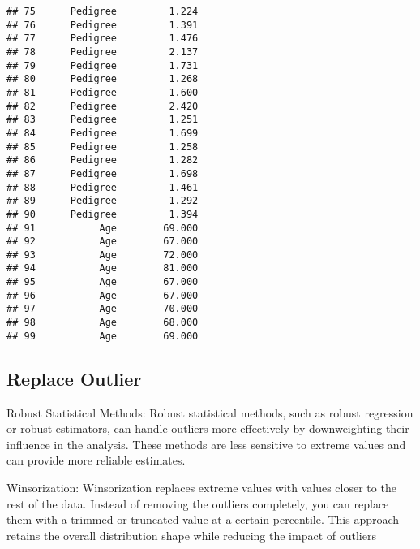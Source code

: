 \documentclass[
]{article}
\begin{document}
\begin{verbatim}
## 75      Pedigree         1.224
## 76      Pedigree         1.391
## 77      Pedigree         1.476
## 78      Pedigree         2.137
## 79      Pedigree         1.731
## 80      Pedigree         1.268
## 81      Pedigree         1.600
## 82      Pedigree         2.420
## 83      Pedigree         1.251
## 84      Pedigree         1.699
## 85      Pedigree         1.258
## 86      Pedigree         1.282
## 87      Pedigree         1.698
## 88      Pedigree         1.461
## 89      Pedigree         1.292
## 90      Pedigree         1.394
## 91           Age        69.000
## 92           Age        67.000
## 93           Age        72.000
## 94           Age        81.000
## 95           Age        67.000
## 96           Age        67.000
## 97           Age        70.000
## 98           Age        68.000
## 99           Age        69.000
\end{verbatim}

\hypertarget{replace-outlier}{%
\subsection{Replace Outlier}\label{replace-outlier}}

Robust Statistical Methods: Robust statistical methods, such as robust
regression or robust estimators, can handle outliers more effectively by
downweighting their influence in the analysis. These methods are less
sensitive to extreme values and can provide more reliable estimates.

Winsorization: Winsorization replaces extreme values with values closer
to the rest of the data. Instead of removing the outliers completely,
you can replace them with a trimmed or truncated value at a certain
percentile. This approach retains the overall distribution shape while
reducing the impact of outliers
\end{document}

